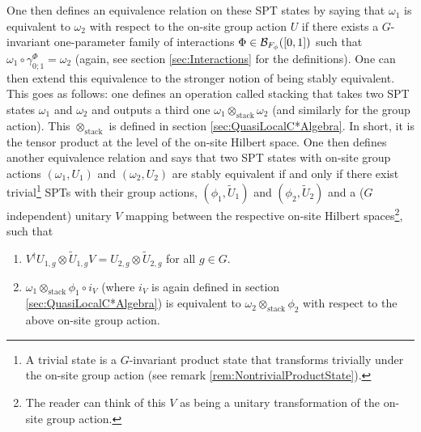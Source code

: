 \documentclass[11pt,a4paper,twoside]{article}
\numberwithin{equation}{section}
\begin{document}
	\\\\
	One then defines an equivalence relation on these SPT states by saying that $\omega_1$ is equivalent to $\omega_2$ with respect to the on-site group action $U$ if there exists a $G$-invariant one-parameter family of interactions $\Phi\in\mathcal B_{F_\phi}([0,1])$ such that $\omega_1\circ\gamma^\Phi_{0;1}=\omega_2$ (again, see section \ref{sec:Interactions} for the definitions). One can then extend this equivalence to the stronger notion of being stably equivalent. This goes as follows: one defines an operation called stacking that takes two SPT states $\omega_1$ and $\omega_2$ and outputs a third one $\omega_1\otimes_{\text{stack}}\omega_2$ (and similarly for the group action). This $\otimes_\text{stack}$ is defined in section \ref{sec:QuasiLocalC*Algebra}. In short, it is the tensor product at the level of the on-site Hilbert space. One then defines another equivalence relation and says that two SPT states with on-site group actions $(\omega_1,U_1)$ and $(\omega_2,U_2)$ are stably equivalent if and only if there exist trivial\footnote{A trivial state is a $G$-invariant product state that transforms trivially under the on-site group action (see remark \ref{rem:NontrivialProductState}).} SPTs with their group actions, $(\phi_1,\tilde{U}_1)$ and $(\phi_2,\tilde{U}_2)$ and a ($G$ independent) unitary $V$ mapping between the respective on-site Hilbert spaces\footnote{The reader can think of this $V$ as being a unitary transformation of the on-site group action.}, such that
	\begin{enumerate}
		\item $V^\dagger U_{1,g}\otimes \tilde{U}_{1,g}V=U_{2,g}\otimes \tilde{U}_{2,g}$ for all $g\in G$.
		\item $\omega_1\otimes_{\text{stack}}\phi_1\circ i_V$ (where $i_V$ is again defined in section \ref{sec:QuasiLocalC*Algebra}) is equivalent to $\omega_2\otimes_{\text{stack}}\phi_2$ with respect to the above on-site group action.
	\end{enumerate}
\end{document}
